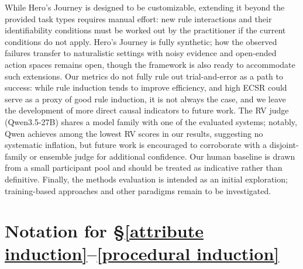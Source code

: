 \documentclass[11pt]{article}
\newcommand{\AS}{{\sc Hero's Journey}\xspace}
\begin{document}
While \AS is designed to be customizable, extending it beyond the provided task types requires manual effort: new rule interactions and their identifiability conditions must be worked out by the practitioner if the current conditions do not apply.
\AS is fully synthetic; how the observed failures transfer to naturalistic settings with noisy evidence and open-ended action spaces remains open, though the framework is also ready to accommodate such extensions.
Our metrics do not fully rule out trial-and-error as a path to success: while rule induction tends to improve efficiency, and high ECSR could serve as a proxy of good rule induction, it is not always the case, and we leave the development of more direct causal indicators to future work. The RV judge (Qwen3.5-27B) shares a model family with one of the evaluated systems; notably, Qwen achieves among the lowest RV scores in our results, suggesting no systematic inflation, but future work is encouraged to corroborate with a disjoint-family or ensemble judge for additional confidence.
Our human baseline is drawn from a small participant pool and should be treated as indicative rather than definitive.
Finally, the methods evaluation is intended as an initial exploration; training-based approaches and other paradigms remain to be investigated.


\clearpage
\appendix

\section{Notation for \S\ref{attribute induction}--\ref{procedural induction}}
\label{appx:notation}
\end{document}
